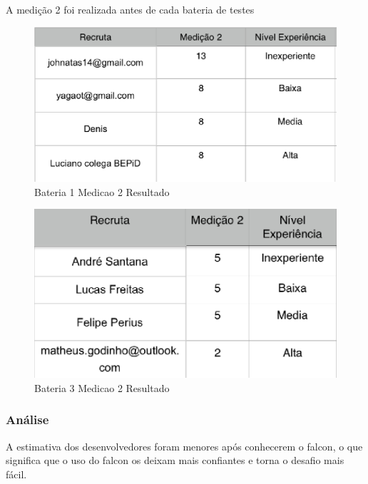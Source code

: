 A medição 2 foi realizada antes de cada bateria de testes


\begin{figure}[H]
  \centering
  \label{fig:indicadores}
  \includegraphics[keepaspectratio=true,scale=0.6]{figuras/Bateria1MEdicao2.eps}
  \caption{Bateria 1 Medicao 2 Resultado}
\end{figure}


\begin{figure}[H]
  \centering
  \label{fig:indicadores}
  \includegraphics[keepaspectratio=true,scale=0.6]{figuras/Bateria3Medicao2.eps}
  \caption{Bateria 3 Medicao 2 Resultado}
\end{figure}



\subsubsection{Análise}
  A estimativa dos desenvolvedores foram menores após conhecerem o falcon, o que significa que o uso do falcon os deixam mais confiantes e torna o desafio mais fácil.



